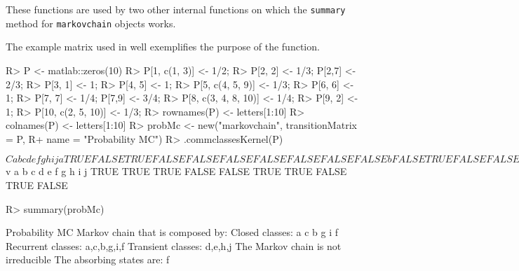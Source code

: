\documentclass[article,nojss]{jss}
\begin{document}
These functions are used by two other internal functions on which the \texttt{summary} method for \texttt{markovchain} objects works.

The example matrix used in \cite{renaldoMatlab} well exemplifies the purpose of the function.

\begin{CodeChunk}

\begin{CodeInput}
R> P <- matlab::zeros(10)
R> P[1, c(1, 3)] <- 1/2;
R> P[2, 2] <- 1/3; P[2,7] <- 2/3;
R> P[3, 1] <- 1;
R> P[4, 5] <- 1;
R> P[5, c(4, 5, 9)] <- 1/3;
R> P[6, 6] <- 1;
R> P[7, 7] <- 1/4; P[7,9] <- 3/4;
R> P[8, c(3, 4, 8, 10)] <- 1/4;
R> P[9, 2] <- 1;
R> P[10, c(2, 5, 10)] <- 1/3;
R> rownames(P) <- letters[1:10] 
R> colnames(P) <- letters[1:10]
R> probMc <- new("markovchain", transitionMatrix = P, 
R+               name = "Probability MC")
R> .commclassesKernel(P)
\end{CodeInput}

\begin{CodeOutput}
$C
      a     b     c     d     e     f     g     h     i     j
a  TRUE FALSE  TRUE FALSE FALSE FALSE FALSE FALSE FALSE FALSE
b FALSE  TRUE FALSE FALSE FALSE FALSE  TRUE FALSE  TRUE FALSE
c  TRUE FALSE  TRUE FALSE FALSE FALSE FALSE FALSE FALSE FALSE
d FALSE FALSE FALSE  TRUE  TRUE FALSE FALSE FALSE FALSE FALSE
e FALSE FALSE FALSE  TRUE  TRUE FALSE FALSE FALSE FALSE FALSE
f FALSE FALSE FALSE FALSE FALSE  TRUE FALSE FALSE FALSE FALSE
g FALSE  TRUE FALSE FALSE FALSE FALSE  TRUE FALSE  TRUE FALSE
h FALSE FALSE FALSE FALSE FALSE FALSE FALSE  TRUE FALSE FALSE
i FALSE  TRUE FALSE FALSE FALSE FALSE  TRUE FALSE  TRUE FALSE
j FALSE FALSE FALSE FALSE FALSE FALSE FALSE FALSE FALSE  TRUE

$v
    a     b     c     d     e     f     g     h     i     j 
 TRUE  TRUE  TRUE FALSE FALSE  TRUE  TRUE FALSE  TRUE FALSE 
\end{CodeOutput}

\begin{CodeInput}
R> summary(probMc)
\end{CodeInput}

\begin{CodeOutput}
Probability MC  Markov chain that is composed by: 
Closed classes: 
a c 
b g i 
f 
Recurrent classes: 
{a,c},{b,g,i},{f}
Transient classes: 
{d,e},{h},{j}
The Markov chain is not irreducible 
The absorbing states are: f
\end{CodeOutput}
\end{CodeChunk}
\end{document}

